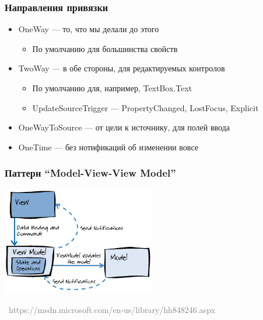 \documentclass[xetex,mathserif,serif]{beamer}
\newcommand{\attribution}[1] {
\vspace{-5mm}\begin{flushright}\begin{scriptsize}\textcolor{gray}{\textcopyright\, #1}\end{scriptsize}\end{flushright}
}
\begin{document}
	\begin{frame}
		\frametitle{Направления привязки}
		\begin{itemize}
			\item OneWay --- то, что мы делали до этого
			\begin{itemize}
				\item По умолчанию для большинства свойств
			\end{itemize}
			\item TwoWay --- в обе стороны, для редактируемых контролов
			\begin{itemize}
				\item По умолчанию для, например, TextBox.Text
				\item UpdateSourceTrigger --- PropertyChanged, LostFocus, Explicit
			\end{itemize}
			\item OneWayToSource --- от цели к источнику, для полей ввода
			\item OneTime --- без нотификаций об изменении вовсе
		\end{itemize}
	\end{frame}

	\begin{frame}
		\frametitle{Паттерн ``Model-View-View Model''}
		\begin{center}
			\includegraphics[width=0.5\textwidth]{mvvm.png}
		\end{center}
		\attribution{https://msdn.microsoft.com/en-us/library/hh848246.aspx}
	\end{frame}
\end{document}
